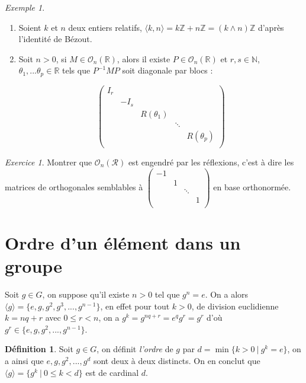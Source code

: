 \documentclass[]{article}
\theoremstyle{remark}
\newtheorem{myexer}{Exercice}
\newtheorem{myexmpl}{Exemple}
\theoremstyle{definition}
\newtheorem{mydef}{Définition}
\begin{document}
\begin{myexmpl}
	\begin{enumerate}
	\item Soient $k$ et $n$ deux entiers relatifs, $\langle k, n \rangle = k\mathbb{Z} + n\mathbb{Z} = (k \land n) \mathbb{Z}$ d'après l'identité de Bézout.
	\item Soit $n > 0$, si $M \in \mathcal{O}_n(\mathbb{R})$, alors il existe $P \in \mathcal{O}_n(\mathbb{R})$ et $r, s \in \mathbb{N}$, $\theta_1, ...\theta_p \in \mathbb{R}$ tels que $P^{-1}MP$ soit diagonale par blocs :
	
	$$
		\left(
		\begin{array}{ccccc}
			I_r &  &  &  & \\
			 & -I_s & & &\\
			 & & R(\theta_1) & &\\
			 & & & \ddots & \\
			 & & & & R(\theta_p)\\
		\end{array}
		\right)
	$$
	\end{enumerate}
\end{myexmpl}

\begin{myexer}
	Montrer que $\mathcal{O}_n(\mathcal{R})$ est engendré par les réflexions, c'est à dire les matrices de orthogonales semblables à $\left(\begin{array}{cccc}
		-1 &&&\\
		&1&&\\
		&&\ddots&\\
		&&&1\\
	\end{array}\right)$ en base orthonormée.
\end{myexer}

\section{Ordre d'un élément dans un groupe}

Soit $g \in G$, on suppose qu'il existe $n > 0$ tel que $g^n=e$.
On a alors $\langle g \rangle = \{e, g, g^2, g^3, ..., g^{n-1}\}$, en effet pour tout $k > 0$, de division euclidienne $k=nq+r$ avec $0 \leqslant r < n$, on a $g^k=g^{nq+r}=e^q g^r=g^r$ d'où $g^r \in \{e, g, g^2, ..., g^{n-1}\}$.

\begin{mydef}
	Soit $g \in G$, on définit \textit{l'ordre} de $g$ par $d=\min \{k > 0 ~ | ~ g^k = e\}$, on a ainsi que $e, g, g^2, ..., g^d$ sont deux à deux distincts. On en conclut que $\langle g \rangle = \{g^k ~ | ~ 0 \leqslant k < d\}$ est de cardinal $d$.
\end{mydef}
\end{document}
